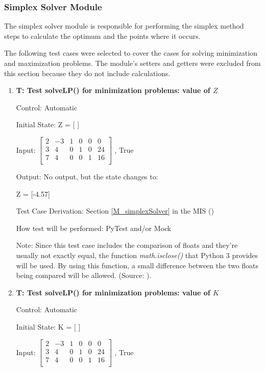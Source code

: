 \documentclass[12pt, titlepage]{article}
\newcounter{testnum} %
\begin{document}
\subsubsection{Simplex Solver Module}

The simplex solver module is responsible for performing the simplex method 
steps to calculate the optimum and the points where it occurs.

The following test cases were selected to cover the cases for solving 
minimization and maximization problems. The module's setters and getters were 
excluded from this section because they do not include calculations.

\begin{enumerate}
	
	\item{\textbf{T\thetestnum \label{solveLpMinZ}: 
	Test solveLP() for minimization problems: value of $Z$}}

	Control: Automatic
	
	Initial State: Z = [ ]
	
	Input: 	$\begin{bmatrix}
	2 & -3 & 1 & 0 & 0 & 0\\
	3 & 4 & 0 & 1 & 0 & 24\\
	7 & 4 & 0 & 0 & 1 & 16\\
	\end{bmatrix}$ , True 
	
	Output: No output, but the state changes to:
	
	Z = [-4.57]
	
	Test Case Derivation: Section \ref{M_simplexSolver} in the MIS 
	(\cite{losms-mis})
	
	How test will be performed: PyTest and/or Mock
	
	Note: Since this test case includes the comparison of floats and they're 
	usually not exactly equal, the function \textit{math.isclose()} that Python 
	3 provides will be used. By using this function, a small difference between 
	the two floats being compared will be allowed. (Source: \cite{python3-doc}).
	
	\item{\textbf{T\thetestnum \label{solveLpMinK}: 
			Test solveLP() for minimization problems: value of $K$}}
	
	Control: Automatic
	
	Initial State: K = [ ]
	
	Input: 	$\begin{bmatrix}
	2 & -3 & 1 & 0 & 0 & 0\\
	3 & 4 & 0 & 1 & 0 & 24\\
	7 & 4 & 0 & 0 & 1 & 16\\
	\end{bmatrix}$ , True 
	

\end{enumerate}
\end{document}
